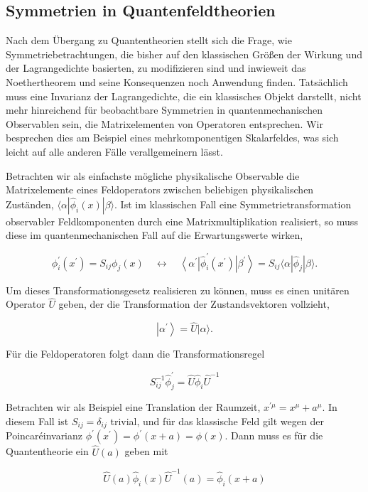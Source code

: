 \documentclass[10pt, letterpaper]{article}
\begin{document}
\subsection*{Symmetrien in Quantenfeldtheorien}
Nach dem Übergang zu Quantentheorien stellt sich die Frage, wie Symmetriebetrachtungen, die bisher auf den klassischen Größen der Wirkung und der Lagrangedichte basierten, zu modifizieren sind und inwieweit das Noethertheorem und seine Konsequenzen noch Anwendung finden. Tatsächlich muss eine Invarianz der Lagrangedichte, die ein klassisches Objekt darstellt, nicht mehr hinreichend für beobachtbare Symmetrien in quantenmechanischen Observablen sein, die Matrixelementen von Operatoren entsprechen. Wir besprechen dies am Beispiel eines mehrkomponentigen Skalarfeldes, was sich leicht auf alle anderen Fälle verallgemeinern lässt.

Betrachten wir als einfachste mögliche physikalische Observable die Matrixelemente eines Feldoperators zwischen beliebigen physikalischen Zuständen, $\langle\alpha| \hat{\phi}_{i}(x)|\beta\rangle$. Ist im klassischen Fall eine Symmetrietransformation observabler Feldkomponenten durch eine Matrixmultiplikation realisiert, so muss diese im quantenmechanischen Fall auf die Erwartungswerte wirken,

$$
\phi_{i}^{\prime}\left(x^{\prime}\right)=S_{i j} \phi_{j}(x) \quad \longleftrightarrow \quad\left\langle\alpha^{\prime}\right| \hat{\phi}_{i}^{\prime}\left(x^{\prime}\right)\left|\beta^{\prime}\right\rangle=S_{i j}\langle\alpha| \hat{\phi}_{j}|\beta\rangle .
$$

Um dieses Transformationsgesetz realisieren zu können, muss es einen unitären Operator $\hat{U}$ geben, der die Transformation der Zustandsvektoren vollzieht,

$$
\left|\alpha^{\prime}\right\rangle=\hat{U}|\alpha\rangle .
$$

Für die Feldoperatoren folgt dann die Transformationsregel

$$
S_{i j}^{-1} \hat{\phi}_{j}^{\prime}=\hat{U} \hat{\phi}_{i} \hat{U}^{-1}
$$

Betrachten wir als Beispiel eine Translation der Raumzeit, $x^{\prime \mu}=x^{\mu}+a^{\mu}$. In diesem Fall ist $S_{i j}=\delta_{i j}$ trivial, und für das klassische Feld gilt wegen der Poincaréinvarianz $\phi^{\prime}\left(x^{\prime}\right)=\phi^{\prime}(x+a)=\phi(x)$. Dann muss es für die Quantentheorie ein $\hat{U}(a)$ geben mit

$$
\hat{U}(a) \hat{\phi}_{i}(x) \hat{U}^{-1}(a)=\hat{\phi}_{i}(x+a)
$$
\end{document}
